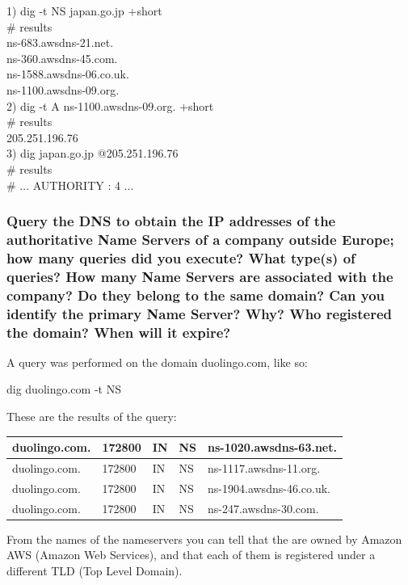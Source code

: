 \documentclass[a4paper,10pt]{article}
\begin{document}
1) dig -t NS japan.go.jp +short\\

\# results\\
ns-683.awsdns-21.net.\\
ns-360.awsdns-45.com.\\
ns-1588.awsdns-06.co.uk.\\
ns-1100.awsdns-09.org.\\


2) dig -t A ns-1100.awsdns-09.org. +short\\

\# results\\
205.251.196.76\\


3) dig japan.go.jp  @205.251.196.76\\

\# results\\
\# ... AUTHORITY : 4 ...


\subsubsection{Query the DNS to obtain the IP addresses of the authoritative Name Servers of a company outside Europe; how many queries did you execute? What type(s) of
queries? How many Name Servers are associated with the company? Do they
belong to the same domain? Can you identify the primary Name Server? Why?
Who registered the domain? When will it expire?}

A query was performed on the domain duolingo.com, like so:

dig duolingo.com -t NS 

These are the results of the query:\\

\begin{table}[h!]
\centering
\begin{tabular}{|l|l|l|l|l|}
\hline
duolingo.com. & 172800 & IN & NS & ns-1020.awsdns-63.net.   \\ \hline
duolingo.com. & 172800 & IN & NS & ns-1117.awsdns-11.org.   \\ \hline
duolingo.com. & 172800 & IN & NS & ns-1904.awsdns-46.co.uk. \\ \hline
duolingo.com. & 172800 & IN & NS & ns-247.awsdns-30.com.    \\ \hline
\end{tabular}
\label{fig:table3}
\end{table}

From the names of the nameservers you can tell that the are owned by Amazon AWS (Amazon Web Services), and that each of them is registered under a different TLD (Top Level Domain). \\
\end{document}
